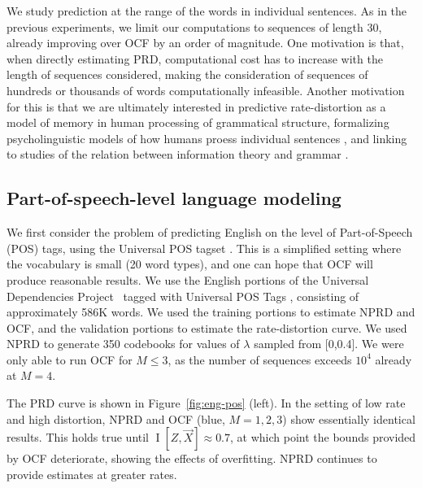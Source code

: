 \documentclass[entropy,article,submit,moreauthors,pdftex,10pt,a4paper]{Definitions/mdpi}
\newcommand{\future}{\overrightarrow{X}}
\begin{document}

We study prediction at the range of the words in individual sentences.
As in the previous experiments, we limit our computations to sequences of length 30, already improving over OCF by an order of magnitude.
One motivation is that, when directly estimating PRD, computational cost has to increase with the length of sequences considered, making the consideration of sequences of hundreds or thousands of words computationally infeasible.
Another motivation for this is that we are ultimately interested in predictive rate-distortion as a model of memory in human processing of grammatical structure, formalizing psycholinguistic models of how humans proess individual sentences \citep{gibson-linguistic-1998,futrell-noisy-context-2017}, and linking to studies of the relation between information theory and grammar \citep{koplenig2017statistical}.





\subsection{Part-of-speech-level language modeling}\label{sec:pos}

We first consider the problem of predicting English on the level of Part-of-Speech (POS) tags, using the Universal POS tagset \citep{petrov-universal-2012}. 
This is a simplified setting where the vocabulary is small (20 word types), and one can hope that OCF will produce reasonable results.
We use the English portions of the Universal Dependencies Project~\citep{nivre-universal-2017} tagged with Universal POS Tags \citep{petrov-universal-2012}, consisting of approximately 586K words.
We used the training portions to estimate NPRD and OCF, and the validation portions to estimate the rate-distortion curve.
We used NPRD to generate 350 codebooks for values of $\lambda$ sampled from [0,0.4].
We were only able to run OCF for $M \leq 3$, as the number of sequences exceeds $10^4$ already at $M=4$.


The PRD curve is shown in Figure~\ref{fig:eng-pos} (left).
In the setting of low rate and high distortion, NPRD and OCF (blue, $M=1,2,3$) show essentially identical results.
This holds true until $\operatorname{I}[Z, \future] \approx 0.7$, at which point the bounds provided by OCF deteriorate, showing the effects of overfitting.
NPRD continues to provide estimates at greater rates.
\end{document}
